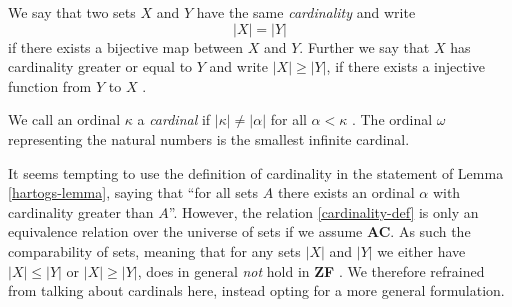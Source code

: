 \documentclass[../../main.tex]{subfiles}
\begin{document}
\begin{remark}
    We say that two sets $X$ and $Y$ have the same \emph{cardinality} and write 
    \begin{equation}\label{cardinality-def}
        \left\lvert X\right\rvert = \left\lvert Y\right\rvert
    \end{equation}
    if there exists a bijective map between $X$ and $Y$.
    Further we say that $X$ has cardinality greater or equal to $Y$ and write $\left\lvert X\right\rvert \geq \left\lvert Y\right\rvert$,
    if there exists a injective function from $Y$ to $X$ \cite[p.22]{Jec78}.

    We call an ordinal $\kappa$ a \emph{cardinal} if $\left\lvert \kappa\right\rvert \neq \left\lvert \alpha\right\rvert$ for all $\alpha < \kappa$ \cite[p.24]{Jec78}.
    The ordinal $\omega$ representing the natural numbers is the smallest infinite cardinal.

    It seems tempting to use the definition of cardinality in the statement of Lemma \ref{hartogs-lemma}, 
    saying that ``for all sets $A$ there exists an ordinal $\alpha$ with cardinality greater than $A$''.
    However, the relation \eqref{cardinality-def} is only an equivalence relation over the universe of sets if we assume \textbf{AC}.
    As such the comparability of sets, meaning that for any sets $\left\lvert X\right\rvert$ and $\left\lvert Y\right\rvert$ we either have
    $\left\lvert X\right\rvert \leq \left\lvert Y\right\rvert$ or $\left\lvert X\right\rvert \geq \left\lvert Y\right\rvert$, does in general \emph{not} hold in \textbf{ZF} \cite[p.38]{Jec78}.
    We therefore refrained from talking about cardinals here, instead opting for a more general formulation.
\end{remark}
\end{document}
